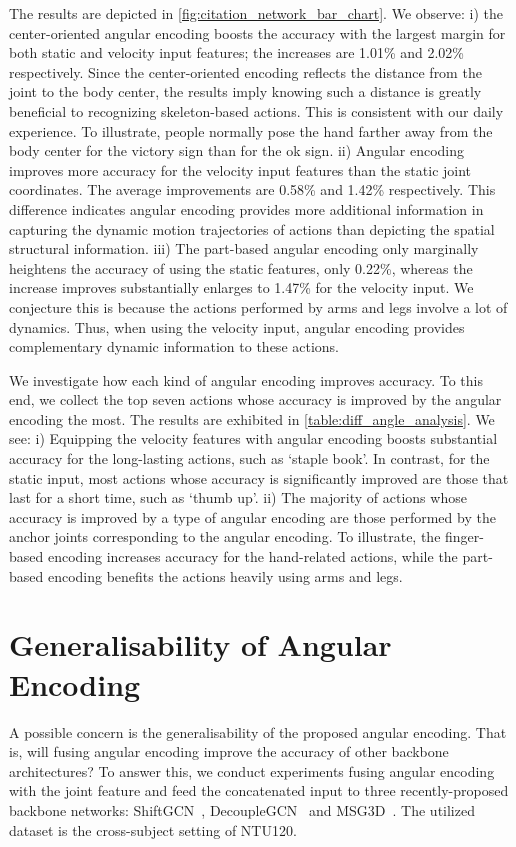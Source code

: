 \documentclass[journal,comsoc]{IEEEtran}
\begin{document}
The results are depicted in \autoref{fig:citation_network_bar_chart}. We observe: 
i) the center-oriented angular encoding boosts the accuracy with the largest margin for both static and velocity input features; the increases are 1.01\% and 2.02\% respectively. Since the center-oriented encoding reflects the distance from the joint to the body center, the results imply knowing such a distance is greatly beneficial to recognizing skeleton-based actions. This is consistent with our daily experience. To illustrate, people normally pose the hand farther away from the body center for the victory sign than for the ok sign. 
ii) Angular encoding improves more accuracy for the velocity input features than the static joint coordinates. The average improvements are 0.58\% and 1.42\% respectively. This difference indicates angular encoding provides more additional information in capturing the dynamic motion trajectories of actions than depicting the spatial structural information. iii) The part-based angular encoding only marginally heightens the accuracy of using the static features, only 0.22\%, whereas the increase improves substantially enlarges to 1.47\% for the velocity input. We conjecture this is because the actions performed by arms and legs involve a lot of dynamics. Thus, when using the velocity input, angular encoding provides complementary dynamic information to these actions. 

We investigate how each kind of angular encoding improves accuracy. To this end, we collect the top seven actions whose accuracy is improved by the angular encoding the most. The results are exhibited in \autoref{table:diff_angle_analysis}. We see: i) Equipping the velocity features with angular encoding boosts substantial accuracy for the long-lasting actions, such as `staple book'. In contrast, for the static input, most actions whose accuracy is significantly improved are those that last for a short time, such as `thumb up'. ii) The majority of actions whose accuracy is improved by a type of angular encoding are those performed by the anchor joints corresponding to the angular encoding. To illustrate, the finger-based encoding increases accuracy for the hand-related actions, while the part-based encoding benefits the actions heavily using arms and legs. 

 

\section{Generalisability of Angular Encoding}
A possible concern is the generalisability of the proposed angular encoding. That is, will fusing angular encoding improve the accuracy of other backbone architectures? To answer this, we conduct experiments fusing angular encoding with the joint feature and feed the concatenated input to three recently-proposed backbone networks: ShiftGCN~\cite{cheng2020skeleton}, DecoupleGCN~\cite{chengdecoupling} and MSG3D~\cite{liu2020disentangling}. The utilized dataset is the cross-subject setting of NTU120. 
\end{document}
